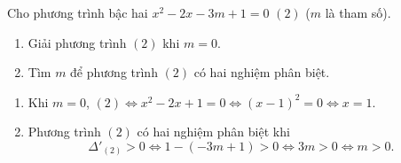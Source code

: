 \begin{ex}%
	Cho phương trình bậc hai $x^2-2x-3m+1=0$ $(2)$ ($m$ là tham số).
    \begin{enumerate}    
        \item Giải phương trình $(2)$ khi $m=0$.
        \item Tìm $m$ để phương trình $(2)$ có hai nghiệm phân biệt.
    \end{enumerate}
\loigiai
    {
    \begin{enumerate}
        \item Khi $m=0$, $(2) \Leftrightarrow x^2-2x+1=0 \Leftrightarrow (x-1)^2=0 \Leftrightarrow x=1$.
        \item Phương trình $(2)$ có hai nghiệm phân biệt khi $$\Delta'_{(2)}>0 \Leftrightarrow 1-(-3m+1)>0 \Leftrightarrow 3m>0 \Leftrightarrow m>0.$$
    \end{enumerate}
    }
\end{ex}

